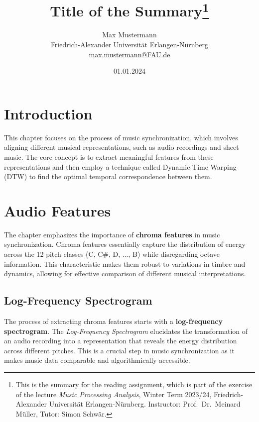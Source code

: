 \documentclass[a4paper, 9pt, twocolumn]{extarticle}
\begin{document}
\date{\normalsize 01.01.2024}

\title{\vspace{-8mm}\textbf{\Large
Title of the Summary\footnote{This is the summary for the reading assignment,
which is part of the exercise of the lecture \emph{Music Processing Analysis}, Winter Term 2023/24,
Friedrich-Alexander Universit\"at Erlangen-N\"urnberg.
Instructor: Prof.\ Dr.\ Meinard M\"uller,
Tutor: Simon Schw\"ar.
}}}

\author{
{
\begin{minipage}{\textwidth}
\center
Max Mustermann\\
\small
Friedrich-Alexander Universit\"at Erlangen-N\"urnberg
\protect\\{} %
\url{max.mustermann@FAU.de}
\end{minipage}
}
}

\maketitle
\thispagestyle{empty}

\section{Introduction}
\label{section:introduction}

This chapter focuses on the process of music synchronization, which
involves aligning different musical representations, such as audio
recordings and sheet music. The core concept is to extract meaningful
features from these representations and then employ a technique called
Dynamic Time Warping (DTW) to find the optimal temporal correspondence
between them.
\section{Audio Features}
The chapter emphasizes the importance of \textbf{chroma features} in music
synchronization. Chroma features essentially capture the distribution of
energy across the 12 pitch classes (C, C\#, D, ..., B) while
disregarding octave information. This characteristic makes them robust
to variations in timbre and dynamics, allowing for effective comparison
of different musical interpretations.
\subsection{Log-Frequency Spectrogram}
The process of extracting chroma features starts with a
\textbf{log-frequency spectrogram}. The \emph{Log-Frequency Spectrogram}
elucidates the transformation of an audio recording into a
representation that reveals the energy distribution across different
pitches. This is a crucial step in music synchronization as it makes
music data comparable and algorithmically accessible.
\end{document}

